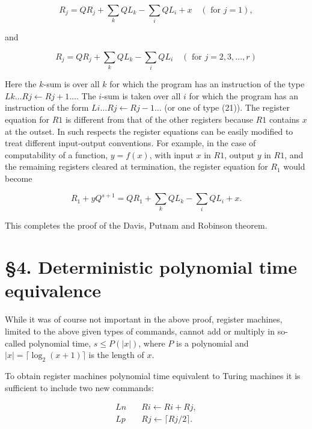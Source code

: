 \documentclass[11pt,leqno]{article}
\newcommand{\origpage}[1]{\marginnote{\footnotesize\textbf{[#1]}}}
\begin{document}
\begin{equation*}
R_{j}=Q R_{j}+\sum_{k} Q L_{k}-\sum_{i} Q L_{i}+x \quad(\text { for } j=1), \tag{38}\label{eq:38}
\end{equation*}

\noindent and\nopagebreak

\begin{equation*}
R_{j}=Q R_{j}+\sum_{k} Q L_{k}-\sum_{i} Q L_{i} \quad(\text { for } j=2,3, \ldots, r) \tag{39}\label{eq:39}
\end{equation*}

\origpage{826}Here the $k$-sum is over all $k$ for which the program has an instruction of the type $L k \ldots R j \leftarrow R j+1 \ldots$. The $i$-sum is taken over all $i$ for which the program has an instruction of the form $L i \ldots R j \leftarrow R j-1 \ldots$ (or one of type (21)). The register equation for $R 1$ is different from that of the other registers because $R 1$ contains $x$ at the outset. In such respects the register equations can be easily modified to treat different input-output conventions. For example, in the case of computability of a function, $y=f(x)$, with input $x$ in $R1$, output $y$ in $R1$, and the remaining registers cleared at termination, the register equation for $R_{1}$ would become

\begin{equation*}
R_{1}+y Q^{s+1}=Q R_{1}+\sum_{k} Q L_{k}-\sum_{i} Q L_{i}+x . \tag{40}\label{eq:40}
\end{equation*}

This completes the proof of the Davis, Putnam and Robinson theorem.

\section*{\S4. Deterministic polynomial time equivalence} While it was of course not important in the above proof, register machines, limited to the above given types of commands, cannot add or multiply in so-called polynomial time, $s \leq P(|x|)$, where $P$ is a polynomial and $|x|=\lceil\log_2(x+1)\rceil$ is the length of $x$.

To obtain register machines polynomial time equivalent to Turing machines it is sufficient to include two new commands:

\begin{align*}
L n&\quad R i\leftarrow R i+R j, \tag{41}\label{eq:41}\\
L p&\quad R j\leftarrow\lceil R j/2\rceil. \tag{42}\label{eq:42}
\end{align*}
\end{document}
